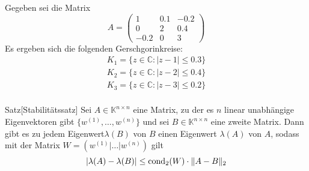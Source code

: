 \documentclass{article}
\begin{document}
    \begin{egbox}
        Gegeben sei die Matrix 
        \[A = \begin{pmatrix}
            1 & 0.1 & -0.2 \\ 0 & 2 & 0.4 \\ -0.2 & 0 & 3
        \end{pmatrix}\]
        Es ergeben sich die folgenden Gerschgorinkreise:
        \begin{align*}
            K_1 = \{z\in\mathbb{C} : |z-1|\leq 0.3\} \\
            K_2 = \{z\in\mathbb{C} : |z-2|\leq 0.4\} \\
            K_3 = \{z\in\mathbb{C} : |z-3|\leq 0.2\} \\
        \end{align*}
        \begin{center}
        \end{center}
    \end{egbox}
    \begin{thmbox}{Satz}[Stabilitätssatz]
        Sei $A\in\mathbb{K}^{n\times n}$ eine Matrix, zu der es $n$ linear unabhängige Eigenvektoren gibt 
        $\{w^{(1)},\dotsc,w^{(n)}\}$ und sei $B\in\mathbb{K}^{n\times n}$ eine zweite Matrix. Dann gibt es zu 
        jedem Eigenwert$\lambda(B)$ von $B$ einen Eigenwert $\lambda(A)$ von $A$, sodass mit der Matrix 
        $W=(w^{(1)}|\dotsc|w^{(n)})$ gilt
        \[|\lambda(A)-\lambda(B)|\leq\text{cond}_2(W)\cdot\|A-B\|_2\]
    \end{thmbox}
\end{document}
